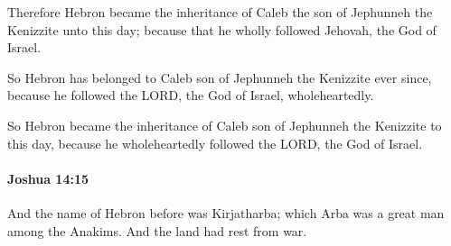 			\begin{versebox}
					\item[BHS] 
					\item[ASV] Therefore Hebron became the inheritance of Caleb the son of Jephunneh the Kenizzite unto this day; because that he wholly followed Jehovah, the God of Israel.
					\item[NIV] So Hebron has belonged to Caleb son of Jephunneh the Kenizzite ever since, because he followed the LORD, the God of Israel, wholeheartedly.
					\item[NRSV] So Hebron became the inheritance of Caleb son of Jephunneh the Kenizzite to this day, because he wholeheartedly followed the LORD, the God of Israel.
			\end{versebox}

		\paragraph{Joshua 14:15} %
			\label{JOSHUA-14-15}

			And the name of Hebron before was Kirjatharba; which Arba was a great man among the Anakims. And the land had rest from war.

